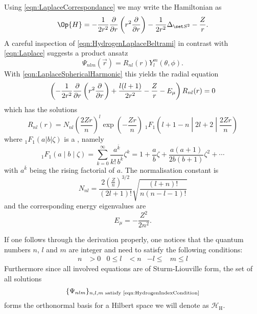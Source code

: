 \noindent
Using \eqref{eqn:LaplaceCorrespondance} we may write the Hamiltonian as
\begin{equation}
	\label{eqn:HydrogenLaplaceBeltrami}
	\Op{H} = -\frac{1}{2r^2} \laplaceRadial -\frac{1}{2r^2} \laplaceSphere - \frac{Z}{r}.
\end{equation}
A careful inspection of \eqref{eqn:HydrogenLaplaceBeltrami}
in contrast with \eqref{eqn:Laplace}
suggests a product ansatz
\[ \Psi_{nlm}(\vec{r}) = R_{nl}(r) Y_l^m(\theta, \phi). \]
%
With \eqref{eqn:LaplaceSphericalHarmonic} this yields the radial equation
\begin{equation}
	\left( - \frac{1}{2r^2} \frac{\partial}{\partial r} \left( r^2 \frac{\partial}{\partial r} \right) + \frac{l (l+1)}{2 r^2} - \frac{Z}{r} - E_\mu \right) R_{nl}(r) = 0
	\label{eqn:HydrogenRadial}
\end{equation}
which has the solutions~\cite{Mueller2000}
\begin{equation}
	 R_{nl}(r) = N_{nl} \left(\frac{2Zr}{n}\right)^l \exp\left(-\frac{Zr}{n} \right)
\;_1F_1\!\left(l+1-n \middle| 2l+2 \middle|\frac{2Zr}{n}\right)
	\label{eqn:HydrogenRadialSolution}
\end{equation}
where $_1F_1\!\left(a|b|\zeta\right)$ is a ,
namely~\cite{Avery2006}
\begin{equation}
	_1F_1\left(a \middle| b \middle| \zeta\right) =
	\sum_{k=0}^\infty \frac{a^{\bar{k}}}{k! \, b^{\bar{k}}} \zeta^k =
	1 + \frac{a}{b} \zeta + \frac{a(a+1)}{2b(b+1)} \zeta^2 + \cdots
	\label{eqn:ConfluentHypergeometric}
\end{equation}
with $a^{\bar{k}}$ being the rising factorial of $a$.
The normalisation constant is
\[ N_{nl} = \frac{2 \left( \frac{Z}{n} \right)^{3/2}}{(2l+1)!} \sqrt{ \frac{(l+n)!}{n (n-l-1)!}} \]
and the corresponding energy eigenvalues are
\begin{equation}
	E_{\mu} = - \frac{Z^2}{2n^2}.
	\label{eqn:HydrogenEnergyLevels}
\end{equation}

If one follows through the derivation properly,
one notices that the quantum numbers $n$, $l$ and $m$ are integer and need to satisfy
the following conditions:
\begin{align}
	\label{eqn:HydrogenIndexCondition}
	n &> 0 & 0 \leq l &< n & -l \leq &m \leq l
\end{align}
Furthermore since all involved equations are of Sturm-Liouville form,
the set of all solutions
\[
	\{\Psi_{nlm} \}_{n,l,m \text{ satisfy \eqref{eqn:HydrogenIndexCondition}}}
\]
forms the orthonormal basis for a Hilbert space we will denote as $\mathcal{H}_\text{H}$.

